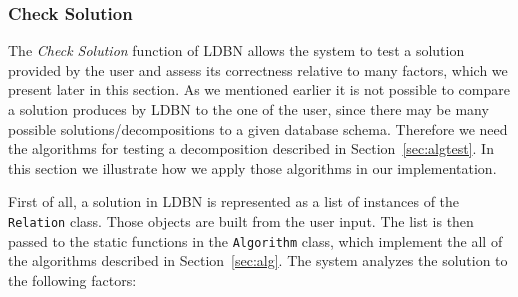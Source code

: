 \subsubsection{Check Solution}  
The \textit{Check Solution} function of LDBN allows the system to test a solution 
provided by the user and assess its correctness relative to many factors, which
we present later in this section. As we mentioned earlier it is not possible
to compare a solution produces by LDBN to the one of the user, since there may be many
possible solutions/decompositions to a given database schema. Therefore we need the
algorithms for testing a decomposition described in Section~\ref{sec:algtest}. In this section
we illustrate how we apply those algorithms in our implementation. 

First of all, a solution in LDBN is represented as a list of instances of the
\verb=Relation= class. Those objects are built from the user input. The list is then
passed to the static functions in the \verb=Algorithm= class, which 
implement the all of the algorithms described in Section~\ref{sec:alg}. 
The system analyzes the solution to the following factors:

